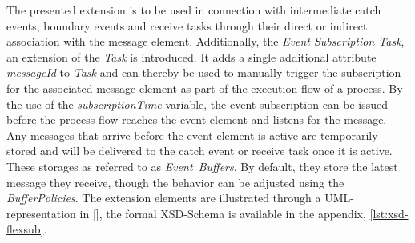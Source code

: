 The presented extension is to be used in connection with intermediate catch events, boundary events and receive tasks through their direct or indirect association with the message element.
Additionally, the \textit{Event Subscription Task}, an extension of the \textit{Task} is introduced. It adds a single additional attribute \textit{messageId} to \textit{Task} and can thereby be used to manually trigger the subscription for the associated message element as part of the execution flow of a process.
By the use of the \textit{subscriptionTime} variable, the event subscription can be issued before the process flow reaches the event element and listens for the message. %
Any messages that arrive before the event element is active are temporarily stored and will be delivered to the catch event or receive task once it is active.
These storages as referred to as \textit{Event~Buffers}. By default, they store the latest message they receive, though the behavior can be adjusted using the \textit{BufferPolicies}.
The extension elements are illustrated through a UML-representation in \autoref{}, the formal XSD-Schema is available in the appendix, \autoref{lst:xsd-flexsub}.





